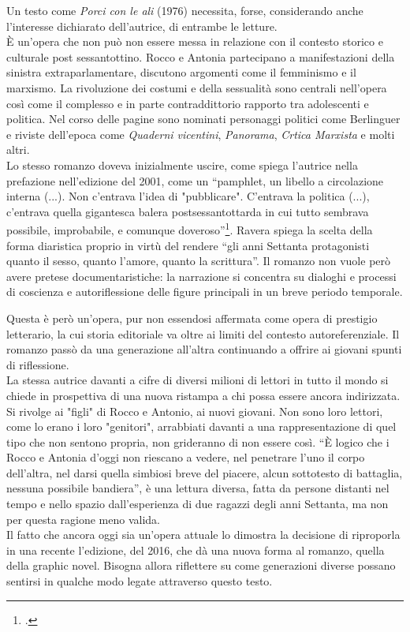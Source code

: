Un testo come \textit{Porci con le ali} (1976) necessita, forse, considerando anche l'interesse dichiarato dell'autrice, di entrambe le letture.
\\È un'opera che non può non essere messa in relazione con il contesto storico e culturale post sessantottino.
Rocco e Antonia partecipano a manifestazioni della sinistra extraparlamentare, discutono argomenti come il femminismo e il marxismo.
La rivoluzione dei costumi e della sessualità sono centrali nell'opera così come il complesso e in parte contraddittorio rapporto tra adolescenti e politica.
Nel corso delle pagine sono nominati personaggi politici come Berlinguer e riviste dell'epoca come \textit{Quaderni vicentini}, \textit{Panorama}, \textit{Crtica Marxista} e molti altri.
\\Lo stesso romanzo doveva inizialmente uscire, come spiega l'autrice nella prefazione nell'edizione del 2001, come un \enquote{pamphlet, un libello a circolazione interna (...). Non c'entrava l'idea di "pubblicare". C'entrava la politica (...), c'entrava quella gigantesca balera postsessantottarda  in cui tutto sembrava possibile, improbabile, e comunque doveroso}\footcite[7]{PrefazionePorci}.
Ravera spiega la scelta della forma diaristica proprio in virtù del rendere \enquote{gli anni Settanta protagonisti quanto il sesso, quanto l'amore, quanto la scrittura}.
Il romanzo non vuole però avere pretese documentaristiche: la narrazione si concentra su dialoghi e processi di coscienza e autoriflessione delle figure principali in un breve periodo temporale.

Questa è però un'opera, pur non essendosi affermata come opera di prestigio letterario, la cui storia editoriale va oltre ai limiti del contesto autoreferenziale.
Il romanzo passò da una generazione all'altra continuando a offrire ai giovani spunti di riflessione.
\\La stessa autrice davanti a cifre di diversi milioni di lettori in tutto il mondo si chiede in prospettiva di una nuova ristampa a chi possa essere ancora indirizzata.
\\Si rivolge ai "figli" di Rocco e Antonio, ai nuovi giovani.
Non sono loro lettori, come lo erano i loro "genitori", arrabbiati davanti a una rappresentazione di quel tipo che non sentono propria, non grideranno di non essere così.
\enquote{È logico che i Rocco e Antonia d'oggi non riescano a vedere, nel penetrare l'uno il corpo dell'altra, nel darsi quella simbiosi breve del piacere, alcun sottotesto di battaglia, nessuna possibile bandiera}, è una lettura diversa, fatta da persone distanti nel tempo e nello spazio dall'esperienza di due ragazzi degli anni Settanta, ma non per questa ragione meno valida.
\\Il fatto che ancora oggi sia un'opera attuale lo dimostra la decisione di riproporla in una recente l'edizione, del 2016, che dà una nuova forma al romanzo, quella della graphic novel.
Bisogna allora riflettere su come generazioni diverse possano sentirsi in qualche modo legate attraverso questo testo.

